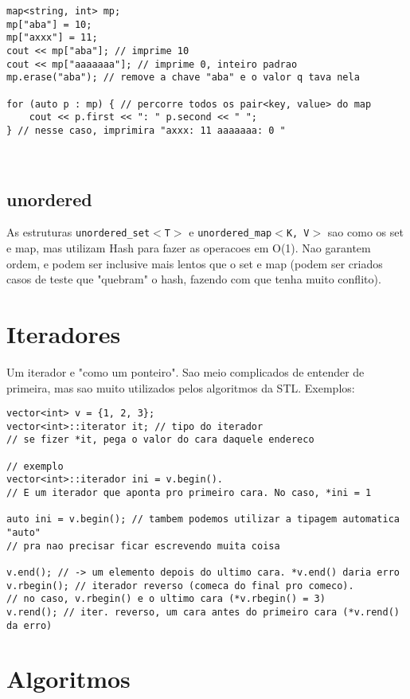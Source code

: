 \begin{lstlisting}
map<string, int> mp;
mp["aba"] = 10;
mp["axxx"] = 11;
cout << mp["aba"]; // imprime 10
cout << mp["aaaaaaa"]; // imprime 0, inteiro padrao
mp.erase("aba"); // remove a chave "aba" e o valor q tava nela

for (auto p : mp) { // percorre todos os pair<key, value> do map
	cout << p.first << ": " p.second << " ";
} // nesse caso, imprimira "axxx: 11 aaaaaaa: 0 "
\end{lstlisting}

\ 


\subsection{unordered}

As estruturas \texttt{unordered\_set$<$T$>$} e \texttt{unordered\_map$<$K, V$>$} sao como os set e map, mas utilizam Hash para fazer as operacoes em O(1). Nao garantem ordem, e podem ser inclusive mais lentos que o set e map (podem ser criados casos de teste que "quebram" o hash, fazendo com que tenha muito conflito).

\section{Iteradores}
    
Um iterador e "como um ponteiro". Sao meio complicados de entender de primeira, mas sao muito utilizados pelos algoritmos da STL. Exemplos:

\begin{lstlisting}
vector<int> v = {1, 2, 3};
vector<int>::iterator it; // tipo do iterador
// se fizer *it, pega o valor do cara daquele endereco

// exemplo
vector<int>::iterador ini = v.begin().
// E um iterador que aponta pro primeiro cara. No caso, *ini = 1

auto ini = v.begin(); // tambem podemos utilizar a tipagem automatica "auto"
// pra nao precisar ficar escrevendo muita coisa

v.end(); // -> um elemento depois do ultimo cara. *v.end() daria erro
v.rbegin(); // iterador reverso (comeca do final pro comeco).
// no caso, v.rbegin() e o ultimo cara (*v.rbegin() = 3)
v.rend(); // iter. reverso, um cara antes do primeiro cara (*v.rend() da erro)
\end{lstlisting}

\section{Algoritmos}

